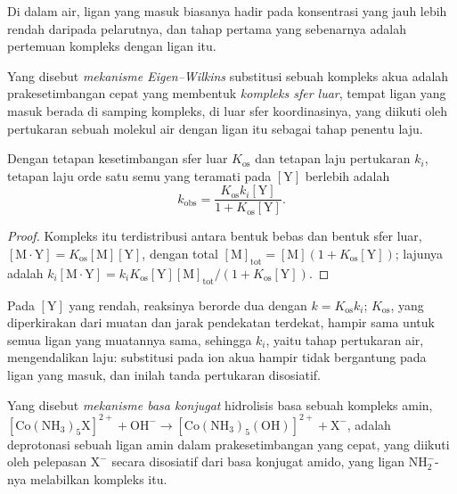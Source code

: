Di dalam air, ligan yang masuk biasanya hadir pada konsentrasi yang jauh lebih
rendah daripada pelarutnya, dan tahap pertama yang sebenarnya adalah
pertemuan kompleks dengan ligan itu.

\begin{definition}\label{def:b3:complex-mechanisms:eigen-wilkins}
Yang disebut \emph{mekanisme Eigen--Wilkins}
substitusi sebuah kompleks akua adalah prakesetimbangan cepat yang membentuk
\emph{kompleks sfer luar}, tempat ligan yang masuk
berada di samping kompleks, di luar sfer koordinasinya, yang diikuti oleh
pertukaran sebuah molekul air dengan ligan itu sebagai tahap penentu laju.
\end{definition}

\begin{theorem}\label{thm:b3:complex-mechanisms:eigen-wilkins}
Dengan tetapan kesetimbangan sfer luar $K_{\mathrm{os}}$ dan tetapan laju pertukaran
$k_i$, tetapan laju orde satu semu yang teramati pada $[\mathrm Y]$ berlebih adalah
\[
  k_{\mathrm{obs}} = \frac{K_{\mathrm{os}}k_i[\mathrm Y]}{1 + K_{\mathrm{os}}[\mathrm Y]} .
\]
\end{theorem}

\begin{proof}
Kompleks itu terdistribusi antara bentuk bebas dan bentuk sfer luar, $[\mathrm{M\cdot Y}] = K_{\mathrm{os}}[\mathrm M][\mathrm Y]$,
dengan total $[\mathrm M]_{\mathrm{tot}} = [\mathrm M](1 + K_{\mathrm{os}}[\mathrm Y])$; lajunya adalah $k_i[\mathrm{M\cdot Y}] = k_iK_{\mathrm{os}}[\mathrm Y][\mathrm M]_{\mathrm{tot}}/(1 + K_{\mathrm{os}}[\mathrm Y])$.
\end{proof}

Pada $[\mathrm Y]$ yang rendah, reaksinya berorde dua dengan $k = K_{\mathrm{os}}k_i$; $K_{\mathrm{os}}$, yang diperkirakan dari
muatan dan jarak pendekatan terdekat, hampir sama untuk semua ligan yang
muatannya sama, sehingga $k_i$, yaitu tahap pertukaran air, mengendalikan
laju: substitusi pada ion akua hampir tidak bergantung pada ligan yang
masuk, dan inilah tanda pertukaran disosiatif.

\begin{definition}\label{def:b3:complex-mechanisms:conjugate-base}
Yang disebut \emph{mekanisme basa konjugat} hidrolisis
basa sebuah kompleks amin, $\mathrm{[Co(NH_3)_5X]^{2+} + OH^- \to [Co(NH_3)_5(OH)]^{2+} + X^-}$, adalah
deprotonasi sebuah ligan amin dalam prakesetimbangan yang cepat, yang diikuti oleh
pelepasan $\mathrm X^-$ secara disosiatif dari basa konjugat amido, yang ligan $\mathrm{NH_2^-}$-nya
melabilkan kompleks itu.
\end{definition}

